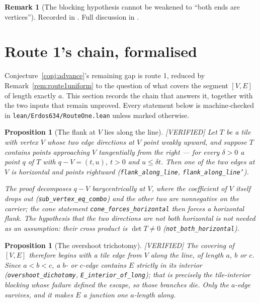 \documentclass[11pt,reqno]{amsart}
\theoremstyle{plain}
\newtheorem{proposition}[theorem]{Proposition}
\theoremstyle{definition}
\newtheorem{remark}[theorem]{Remark}
\newcommand{\lab}[1]{\hfill\textnormal{\footnotesize\textsc{[#1]}}}
\begin{document}
\begin{remark}[The blocking hypothesis cannot be weakened to ``both ends are vertices'']\label{rem:noedgetoedge}
Recorded in \cite{Obstructions}. Full discussion in \cite{Obstructions}.
\end{remark}

\section{Route 1's chain, formalised}\label{sec:routeone}

Conjecture~\ref{conj:advance}'s remaining gap is route 1, reduced by
Remark~\ref{rem:route1uniform} to the question of what covers the segment $[V,E]$ of length exactly
$a$. This section records the chain that answers it, together with the two inputs that remain
unproved. Every statement below is machine-checked in \texttt{lean/Erdos634/RouteOne.lean} unless
marked otherwise.

\begin{proposition}[The flank at $V$ lies along the line]\label{prop:flankline}\lab{VERIFIED}
Let $T$ be a tile with vertex $V$ whose two edge directions at $V$ point weakly upward, and suppose
$T$ contains points approaching $V$ tangentially from the right --- for every $\delta>0$ a point $q$
of $T$ with $q-V=(t,u)$, $t>0$ and $u\le\delta t$. Then one of the two edges at $V$ is horizontal
and points rightward (\texttt{flank\_along\_line}, \texttt{flank\_along\_line'}).

The proof decomposes $q-V$ barycentrically at $V$, where the coefficient of $V$ itself drops out
(\texttt{sub\_vertex\_eq\_combo}) and the other two are nonnegative on the carrier; the cone
statement \texttt{cone\_forces\_horizontal} then forces a horizontal flank. The hypothesis that the
two directions are not \emph{both} horizontal is not needed as an assumption: their cross product is
$\det T\neq0$ (\texttt{not\_both\_horizontal}).
\end{proposition}

\begin{proposition}[The overshoot trichotomy]\label{prop:overshoot}\lab{VERIFIED}
The covering of $[V,E]$ therefore begins with a tile edge from $V$ along the line, of length $a$, $b$
or $c$. Since $a<b<c$, a $b$- or $c$-edge contains $E$ strictly in its interior
(\texttt{overshoot\_dichotomy}, \texttt{E\_interior\_of\_long}); that is precisely the
tile-interior blocking whose failure defined the escape, so those branches die. Only the $a$-edge
survives, and it makes $E$ a junction one $a$-length along.
\end{proposition}
\end{document}
